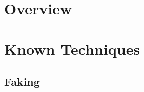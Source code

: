 \documentclass[11pt,fleqn,oneside]{book} %
\begin{document}

\coverpage{\TITLE}{\SUBTITLE}{\AUTHOR}{\DATE}{\SUBJECT}
\backgroundbarvisiblefalse
\newpage



\newpage
\tableofcontents
\backgroundbarvisibletrue

\part{Overview}



\part{Known Techniques}
\chapter{Faking} \label{ch:known-faking}


\end{document}
